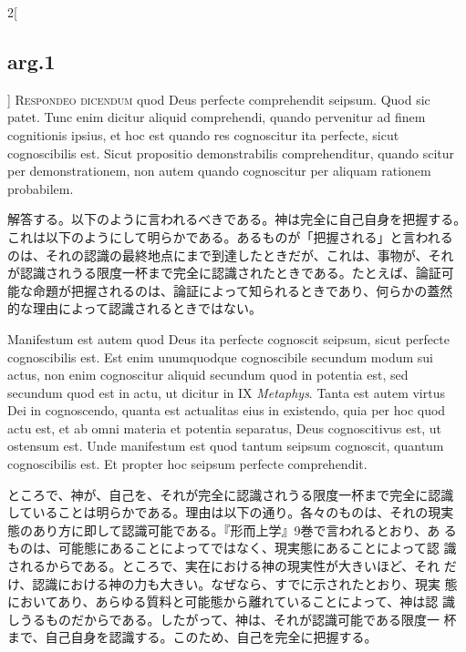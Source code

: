 \documentclass[paper=a4paper,fontsize=10pt,jafontsize=9pt,titlepage]{jlreq}
\begin{document}
\begin{paracol}{2}[\subsection{arg.1}]
{\scshape Respondeo dicendum} quod Deus perfecte comprehendit
seipsum. Quod sic patet. Tunc enim dicitur aliquid comprehendi, quando
pervenitur ad finem cognitionis ipsius, et hoc est quando res
cognoscitur ita perfecte, sicut cognoscibilis est. Sicut propositio
demonstrabilis comprehenditur, quando scitur per demonstrationem, non
autem quando cognoscitur per aliquam rationem probabilem.

\switchcolumn

解答する。以下のように言われるべきである。神は完全に自己自身を把握する。
これは以下のようにして明らかである。あるものが「把握される」と言われる
のは、それの認識の最終地点にまで到達したときだが、これは、事物が、それ
が認識されうる限度一杯まで完全に認識されたときである。たとえば、論証可
能な命題が把握されるのは、論証によって知られるときであり、何らかの蓋然
的な理由によって認識されるときではない。

\switchcolumn*

Manifestum est autem quod Deus ita perfecte cognoscit seipsum, sicut
perfecte cognoscibilis est. Est enim unumquodque cognoscibile secundum
modum sui actus, non enim cognoscitur aliquid secundum quod in
potentia est, sed secundum quod est in actu, ut dicitur in IX
{\itshape Metaphys}. Tanta est autem virtus Dei in cognoscendo, quanta
est actualitas eius in existendo, quia per hoc quod actu est, et ab
omni materia et potentia separatus, Deus cognoscitivus est, ut
ostensum est. Unde manifestum est quod tantum seipsum cognoscit,
quantum cognoscibilis est. Et propter hoc seipsum perfecte
comprehendit.

\switchcolumn

ところで、神が、自己を、それが完全に認識されうる限度一杯まで完全に認識
していることは明らかである。理由は以下の通り。各々のものは、それの現実
態のあり方に即して認識可能である。『形而上学』9巻で言われるとおり、あ
るものは、可能態にあることによってではなく、現実態にあることによって認
識されるからである。ところで、実在における神の現実性が大きいほど、それ
だけ、認識における神の力も大きい。なぜなら、すでに示されたとおり、現実
態においてあり、あらゆる質料と可能態から離れていることによって、神は認
識しうるものだからである。したがって、神は、それが認識可能である限度一
杯まで、自己自身を認識する。このため、自己を完全に把握する。

\switchcolumn*[\subsection{ad.1}]


\end{paracol}
\end{document}
